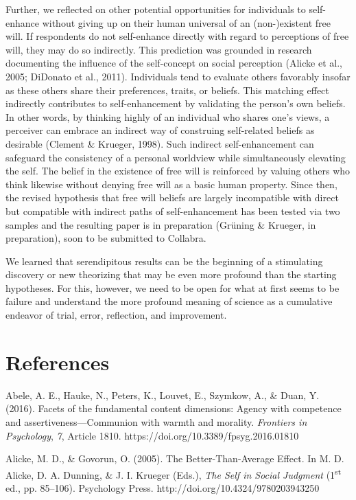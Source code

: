 \documentclass[authordate, anecdote]{jote-new-article}
\begin{document}
	Further, we reflected on other potential opportunities for individuals to self-enhance without giving up on their human universal of an (non-)existent free will. If respondents do not self-enhance directly with regard to perceptions of free will, they may do so indirectly. This prediction was grounded in research documenting the influence of the self-concept on social perception (Alicke et al., 2005; DiDonato et al., 2011). Individuals tend to evaluate others favorably insofar as these others share their preferences, traits, or beliefs. This matching effect indirectly contributes to self-enhancement by validating the person's own beliefs. In other words, by thinking highly of an individual who shares one's views, a perceiver can embrace an indirect way of construing self-related beliefs as desirable (Clement \& Krueger, 1998). Such indirect self-enhancement can safeguard the consistency of a personal worldview while simultaneously elevating the self. The belief in the existence of free will is reinforced by valuing others who think likewise without denying free will as a basic human property. Since then, the revised hypothesis that free will beliefs are largely incompatible with direct but compatible with indirect paths of self-enhancement has been tested via two samples and the resulting paper is in preparation (Grüning \& Krueger, in preparation), soon to be submitted to Collabra.



	We learned that serendipitous results can be the beginning of a stimulating discovery or new theorizing that may be even more profound than the starting hypotheses. For this, however, we need to be open for what at first seems to be failure and understand the more profound meaning of science as a cumulative endeavor of trial, error, reflection, and improvement.



	\section{References}



	Abele, A. E., Hauke, N., Peters, K., Louvet, E., Szymkow, A., \& Duan, Y. (2016). Facets of the fundamental content dimensions: Agency with competence and assertiveness—Communion with warmth and morality. \emph{Frontiers in Psychology}, \emph{7}, Article 1810. https://doi.org/10.3389/fpsyg.2016.01810



	Alicke, M. D., \& Govorun, O. (2005). The Better-Than-Average Effect. In M. D. Alicke, D. A. Dunning, \& J. I. Krueger (Eds.), \emph{The Self in Social Judgment} (1\textsuperscript{st} ed., pp. 85--106). Psychology Press. http://doi.org/10.4324/9780203943250
\end{document}
